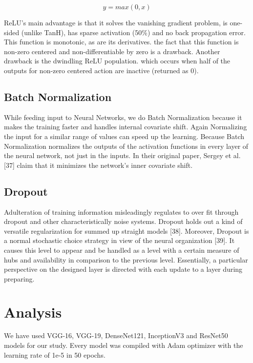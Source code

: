 \vspace{5mm}
\begin{equation*}
y=max(0,x) 
\end{equation*}

\vspace{5mm}
\noindent ReLU's main advantage is that it solves the vanishing gradient problem, is one-sided (unlike TanH), has sparse activation (50\%) and no back propagation error. This function is monotonic, as are its derivatives. the fact that this function is non-zero centered and non-differentiable by zero is a drawback. Another drawback is the dwindling ReLU population. which occurs when half of the outputs for non-zero centered action are inactive (returned as 0).


\vspace{5mm}
\subsection{Batch Normalization}

\vspace{5mm}
While feeding input to Neural Networks, we do Batch Normalization because it makes the training faster and handles internal covariate shift. Again Normalizing the input for a similar range of values can speed up the learning. Because Batch Normalization normalizes the outputs of the activation functions in every layer of the neural network, not just in the inputs. In their original paper, Sergey et al. [37] claim that it minimizes the network's inner covariate shift. 

\vspace{5mm}
\subsection{Dropout}

\vspace{5mm}
Adulteration of training information misleadingly regulates to over fit through dropout and other characteristically noise systems. Dropout holds out a kind of versatile regularization for summed up straight models [38]. Moreover, Dropout is a normal stochastic choice strategy in view of the neural organization [39]. It causes this level to appear and be handled as a level with a certain measure of hubs and availability in comparison to the previous level. Essentially, a particular perspective on the designed layer is directed with each update to a layer during preparing.

\newpage
\section{Analysis}
We have used VGG-16, VGG-19, DenseNet121, InceptionV3 and ResNet50 models for our study. Every model was compiled with Adam optimizer with the learning rate of 1e-5 in 50 epochs. 

